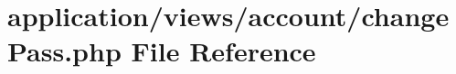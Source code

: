 \hypertarget{change_pass_8php}{\section{application/views/account/change\-Pass.php File Reference}
\label{change_pass_8php}
}
